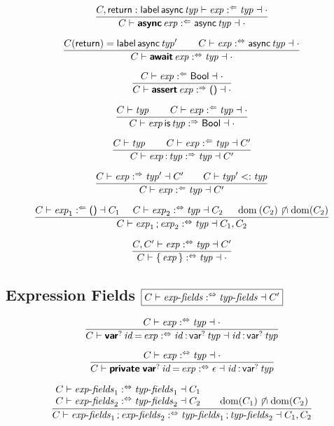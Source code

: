 $$
\frac{
  C, \K{return} : \K{label} \, \K{async} \x{typ} \vdash \x{exp} \anal \x{typ} \dashv \cdot
}{
  C \vdash \KK{async} \x{exp} \anal \K{async} \x{typ} \dashv \cdot
}
$$

$$
\frac{
  C(\K{return}) = \K{label} \, \K{async} \x{typ}'
  \qquad
  C \vdash \x{exp} \analsynth \K{async} \x{typ} \dashv \cdot
}{
  C \vdash \KK{await} \x{exp} \analsynth \x{typ} \dashv \cdot
}
$$

$$
\frac{
  C \vdash \x{exp} \anal \K{Bool} \dashv \cdot
}{
  C \vdash \KK{assert} \x{exp} \synth \K{()} \dashv \cdot
}
$$

$$
\frac{
  C \vdash \x{typ}
  \qquad
  C \vdash \x{exp} \anal \x{typ} \dashv \cdot
}{
  C \vdash \x{exp} \K{is} \x{typ} \synth \K{Bool} \dashv \cdot
}
$$

$$
\frac{
  C \vdash \x{typ}
  \qquad
  C \vdash \x{exp} \anal \x{typ} \dashv C'
}{
  C \vdash \x{exp} \K: \x{typ} \synth \x{typ} \dashv C'
}
$$

$$
\frac{
  C \vdash \x{exp} \synth \x{typ}' \dashv C'
  \qquad
  C \vdash \x{typ}' <: \x{typ}
}{
  C \vdash \x{exp} \anal \x{typ} \dashv C'
}
$$

$$
\frac{
  C \vdash \x{exp}_1 \anal \K{()} \dashv C_1
  \quad~
  C \vdash \x{exp}_2 \analsynth \x{typ} \dashv C_2
  \quad~
  \Dom(C_2) \setdisj \Dom(C_2)
}{
  C \vdash \x{exp}_1 \K; \x{exp}_2 \analsynth \x{typ} \dashv C_1, C_2
}
$$

$$
\frac{
  C, C' \vdash \x{exp} \analsynth \x{typ} \dashv C'
}{
  C \vdash \K\{ \x{exp} \K\} \analsynth \x{typ} \dashv \cdot
}
$$


\subsection*{Expression Fields \hfill $\boxed{C \vdash \x{exp-fields} \analsynth \x{typ-fields} \dashv C'}$}

$$
\frac{
  C \vdash \x{exp} \analsynth \x{typ} \dashv \cdot
}{
  C \vdash \KK{var}^? \x{id} \K= \x{exp} \analsynth \x{id} \K: \, \K{var}^? \x{typ} \dashv \x{id} \K: \, \K{var}^? \x{typ}
}
$$

$$
\frac{
  C \vdash \x{exp} \analsynth \x{typ} \dashv \cdot
}{
  C \vdash \KK{private} \; \KK{var}^? \x{id} \K= \x{exp} \analsynth \epsilon \dashv \x{id} \K: \, \K{var}^? \x{typ}
}
$$

$$
\frac{
  \begin{array}{@{}l@{\qquad}l@{}}
  C \vdash \x{exp-fields}_1 \analsynth \x{typ-fields}_1 \dashv C_1
  \\
  C \vdash \x{exp-fields}_2 \analsynth \x{typ-fields}_2 \dashv C_2
  &
  \Dom(C_1) \setdisj \Dom(C_2)
  \end{array}
}{
  C \vdash \x{exp-fields}_1 \K; \x{exp-fields}_2 \analsynth \x{typ-fields}_1 \K; \x{typ-fields}_2 \dashv C_1, C_2
}
$$


